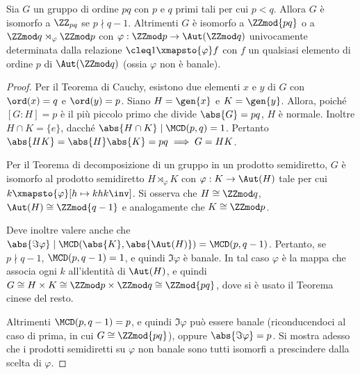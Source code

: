 \documentclass[12pt]{scrartcl}
\begin{document}
	\begin{proposition}
		Sia $G$ un gruppo di ordine $pq$ con $p$ e $q$ primi tali per cui $p < q$. Allora $G$ è
		isomorfo a $\ZZ_{pq}$ se $p \nmid q-1$. Altrimenti $G$ è isomorfo a $\ZZmod{pq}$ o
		a $\ZZmod q \rtimes_\varphi \ZZmod p$ con $\varphi : \ZZmod p \to \Aut(\ZZmod q)$
		univocamente determinata dalla relazione
		$\cleq 1 \xmapsto{\varphi} f$ con $f$ un qualsiasi elemento
		di ordine $p$ di $\Aut(\ZZmod q)$ (ossia $\varphi$ non è banale).
	\end{proposition}
	
	\begin{proof}
		Per il Teorema di Cauchy, esistono due elementi $x$ e $y$ di $G$ con $\ord(x)=q$
		e $\ord(y)=p$. Siano $H = \gen{x}$ e $K = \gen{y}$. Allora, poiché $[G : H] = p$
		è il più piccolo primo che divide $\abs{G} = pq$, $H$ è normale. Inoltre
		$H \cap K = \{e\}$, dacché $\abs{H \cap K} \mid \MCD(p, q) = 1$. Pertanto
		$\abs{HK} = \abs{H} \abs{K} = pq \implies G = HK$. \medskip
		
		
		Per il Teorema di decomposizione di un gruppo in un prodotto semidiretto,
		$G$ è isomorfo al prodotto semidiretto $H \rtimes_\varphi K$ con
		$\varphi : K \to \Aut(H)$ tale per cui $k \xmapsto{\varphi} [h \mapsto k h k\inv]$.
		Si osserva che $H \cong \ZZmod q$, $\Aut(H) \cong \ZZmod{q-1}$ e analogamente che
		$K \cong \ZZmod p$. \medskip
		
		
		Deve inoltre valere anche che $\abs{\Im \varphi} \mid \MCD(\abs{K},
		\abs{\Aut(H)}) = \MCD(p, q-1)$. Pertanto, se $p \nmid q-1$, $\MCD(p, q-1) = 1$,
		e quindi $\Im \varphi$ è banale. In tal caso $\varphi$ è la mappa che associa
		ogni $k$ all'identità di $\Aut(H)$, e quindi $G \cong H \times K \cong \ZZmod p \times \ZZmod q \cong \ZZmod{pq}$, dove si è usato il Teorema cinese del resto. \medskip
		
		
		Altrimenti $\MCD(p, q-1) = p$, e quindi $\Im \varphi$ può essere banale (riconducendoci
		al caso di prima, in cui $G \cong \ZZmod{pq}$), oppure $\abs{\Im \varphi} = p$. Si
		mostra adesso che i prodotti semidiretti su $\varphi$ non banale sono tutti isomorfi
		a prescindere dalla scelta di $\varphi$. \medskip
		
		
	\end{proof}
	
\end{document}
